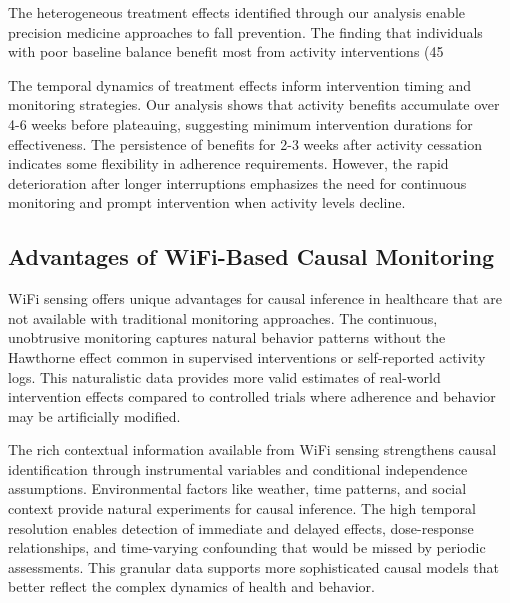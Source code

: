 \documentclass[journal]{IEEEtran}
\begin{document}
The heterogeneous treatment effects identified through our analysis enable precision medicine approaches to fall prevention. The finding that individuals with poor baseline balance benefit most from activity interventions (45%

The temporal dynamics of treatment effects inform intervention timing and monitoring strategies. Our analysis shows that activity benefits accumulate over 4-6 weeks before plateauing, suggesting minimum intervention durations for effectiveness. The persistence of benefits for 2-3 weeks after activity cessation indicates some flexibility in adherence requirements. However, the rapid deterioration after longer interruptions emphasizes the need for continuous monitoring and prompt intervention when activity levels decline.

\subsection{Advantages of WiFi-Based Causal Monitoring}

WiFi sensing offers unique advantages for causal inference in healthcare that are not available with traditional monitoring approaches. The continuous, unobtrusive monitoring captures natural behavior patterns without the Hawthorne effect common in supervised interventions or self-reported activity logs. This naturalistic data provides more valid estimates of real-world intervention effects compared to controlled trials where adherence and behavior may be artificially modified.

The rich contextual information available from WiFi sensing strengthens causal identification through instrumental variables and conditional independence assumptions. Environmental factors like weather, time patterns, and social context provide natural experiments for causal inference. The high temporal resolution enables detection of immediate and delayed effects, dose-response relationships, and time-varying confounding that would be missed by periodic assessments. This granular data supports more sophisticated causal models that better reflect the complex dynamics of health and behavior.
\end{document}
